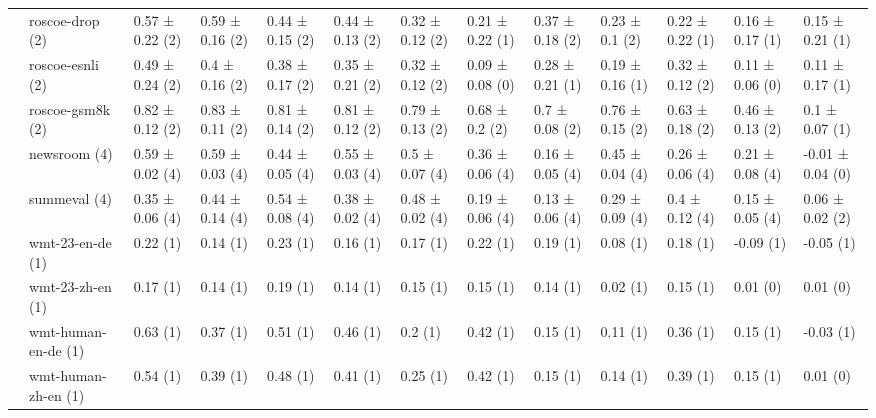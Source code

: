 \begin{tabular}{lllllllllllll}
 & \cellcolor{red!25}roscoe-drop (2) & 0.57 ± 0.22 (2) & 0.59 ± 0.16 (2) & 0.44 ± 0.15 (2) & 0.44 ± 0.13 (2) & 0.32 ± 0.12 (2) & 0.21 ± 0.22 (1) & 0.37 ± 0.18 (2) & 0.23 ± 0.1 (2) & 0.22 ± 0.22 (1) & 0.16 ± 0.17 (1) & 0.15 ± 0.21 (1) \\
 & \cellcolor{red!25}roscoe-esnli (2) & 0.49 ± 0.24 (2) & 0.4 ± 0.16 (2) & 0.38 ± 0.17 (2) & 0.35 ± 0.21 (2) & 0.32 ± 0.12 (2) & 0.09 ± 0.08 (0) & 0.28 ± 0.21 (1) & 0.19 ± 0.16 (1) & 0.32 ± 0.12 (2) & 0.11 ± 0.06 (0) & 0.11 ± 0.17 (1) \\
 & \cellcolor{red!25}roscoe-gsm8k (2) & 0.82 ± 0.12 (2) & 0.83 ± 0.11 (2) & 0.81 ± 0.14 (2) & 0.81 ± 0.12 (2) & 0.79 ± 0.13 (2) & 0.68 ± 0.2 (2) & 0.7 ± 0.08 (2) & 0.76 ± 0.15 (2) & 0.63 ± 0.18 (2) & 0.46 ± 0.13 (2) & 0.1 ± 0.07 (1) \\
 & \cellcolor{red!25}newsroom (4) & 0.59 ± 0.02 (4) & 0.59 ± 0.03 (4) & 0.44 ± 0.05 (4) & 0.55 ± 0.03 (4) & 0.5 ± 0.07 (4) & 0.36 ± 0.06 (4) & 0.16 ± 0.05 (4) & 0.45 ± 0.04 (4) & 0.26 ± 0.06 (4) & 0.21 ± 0.08 (4) & -0.01 ± 0.04 (0) \\
 & \cellcolor{red!25}summeval (4) & 0.35 ± 0.06 (4) & 0.44 ± 0.14 (4) & 0.54 ± 0.08 (4) & 0.38 ± 0.02 (4) & 0.48 ± 0.02 (4) & 0.19 ± 0.06 (4) & 0.13 ± 0.06 (4) & 0.29 ± 0.09 (4) & 0.4 ± 0.12 (4) & 0.15 ± 0.05 (4) & 0.06 ± 0.02 (2) \\
 & \cellcolor{red!25}wmt-23-en-de (1) & 0.22   (1) & 0.14   (1) & 0.23   (1) & 0.16   (1) & 0.17   (1) & 0.22   (1) & 0.19   (1) & 0.08   (1) & 0.18   (1) & -0.09   (1) & -0.05   (1) \\
 & \cellcolor{red!25}wmt-23-zh-en (1) & 0.17   (1) & 0.14   (1) & 0.19   (1) & 0.14   (1) & 0.15   (1) & 0.15   (1) & 0.14   (1) & 0.02   (1) & 0.15   (1) & 0.01   (0) & 0.01   (0) \\
 & \cellcolor{red!25}wmt-human-en-de (1) & 0.63   (1) & 0.37   (1) & 0.51   (1) & 0.46   (1) & 0.2   (1) & 0.42   (1) & 0.15   (1) & 0.11   (1) & 0.36   (1) & 0.15   (1) & -0.03   (1) \\
 & \cellcolor{red!25}wmt-human-zh-en (1) & 0.54   (1) & 0.39   (1) & 0.48   (1) & 0.41   (1) & 0.25   (1) & 0.42   (1) & 0.15   (1) & 0.14   (1) & 0.39   (1) & 0.15   (1) & 0.01   (0) \\
\bottomrule
\end{tabular}
